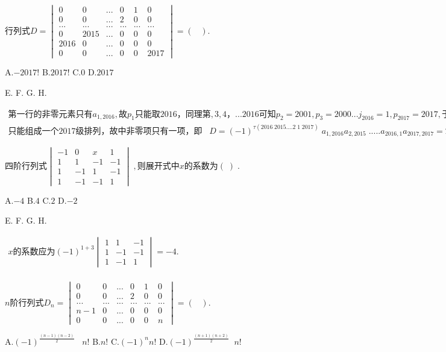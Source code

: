 $\mathrm{行列式}D=\begin{vmatrix}0&0&...&0&1&0\\0&0&...&2&0&0\\...&...&...&...&...&...\\0&2015&...&0&0&0\\2016&0&...&0&0&0\\0&0&...&0&0&2017\end{vmatrix}=(\;\;\;).$

A.$-2017!$   B.$2017!$   C.$0$   D.$2017$

E.   F.   G.   H.

$\begin{array}{l}\mathrm{第一行的非零元素只有}a_{1,2016},故p_1\mathrm{只能取}2016，\mathrm{同理第},3,4，...2016\mathrm{可知}p_2=2001,p_3=2000...j_{2016}=1,p_{2017}=2017,\mathrm{于是在可能取的数码中}，\\\mathrm{只能组成一个}2017\mathrm{级排列}，\mathrm{故中非零项只有一项}，即\;\;\;D=(-1)^{\tau(2016\;2015....2\;1\;2017)}\;a_{1,2016}a_{2,2015}\;.....a_{2016,1}a_{2017,2017}=2017!\;.\;\;\;\;\;\end{array}$


$\mathrm{四阶行列式}\begin{vmatrix}-1&0&x&1\\1&1&-1&-1\\1&-1&1&-1\\1&-1&-1&1\end{vmatrix}\;,\mathrm{则展开式中}x\mathrm{的系数为}(\;)\;.$

A.$-4$   B.$4$   C.$2$   D.$-2$

E.   F.   G.   H.

$\begin{array}{l}x\mathrm{的系数应为}(-1)^{1+3}\begin{vmatrix}1&1&-1\\1&-1&-1\\1&-1&1\end{vmatrix}=-4.\\\end{array}$


$n\mathrm{阶行列式}D_n=\begin{vmatrix}0&0&...&0&1&0\\0&0&...&2&0&0\\...&...&...&...&...&...\\n-1&0&...&0&0&0\\0&0&...&0&0&n\end{vmatrix}=(\;\;\;).$

A.$(-1)^\frac{(n-1)(n-2)}2\;\;\;n!$   B.$n!$   C.$(-1)^nn!$   D.$(-1)^\frac{(n+1)(n+2)}2\;\;n!$

